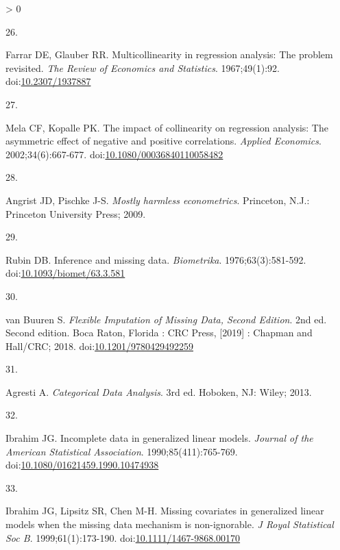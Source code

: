 \documentclass[
]{article}
\newlength{\cslhangindent}
\newlength{\csllabelwidth}
\newenvironment{CSLReferences}[2] %
 {%
  \setlength{\parindent}{0pt}
  \ifodd #1 \everypar{\setlength{\hangindent}{\cslhangindent}}\ignorespaces\fi
  \ifnum #2 > 0
  \setlength{\parskip}{#2\baselineskip}
  \fi
 }%
 {}
\newcommand{\CSLLeftMargin}[1]{\parbox[t]{\csllabelwidth}{#1}}
\newcommand{\CSLRightInline}[1]{\parbox[t]{\linewidth - \csllabelwidth}{#1}\break}
\begin{document}
\begin{CSLReferences}{0}{0}
\leavevmode\hypertarget{ref-farrarMulticollinearityRegressionAnalysis1967}{}%
\CSLLeftMargin{26. }
\CSLRightInline{Farrar DE, Glauber RR. Multicollinearity in regression analysis: The problem revisited. \emph{The Review of Economics and Statistics}. 1967;49(1):92. doi:\href{https://doi.org/10.2307/1937887}{10.2307/1937887}}

\leavevmode\hypertarget{ref-melaImpactCollinearityRegression2002}{}%
\CSLLeftMargin{27. }
\CSLRightInline{Mela CF, Kopalle PK. The impact of collinearity on regression analysis: The asymmetric effect of negative and positive correlations. \emph{Applied Economics}. 2002;34(6):667-677. doi:\href{https://doi.org/10.1080/00036840110058482}{10.1080/00036840110058482}}

\leavevmode\hypertarget{ref-angristpischke2009}{}%
\CSLLeftMargin{28. }
\CSLRightInline{Angrist JD, Pischke J-S. \emph{Mostly harmless econometrics}. Princeton, N.J.: Princeton University Press; 2009.}

\leavevmode\hypertarget{ref-rubinInferenceMissingData1976}{}%
\CSLLeftMargin{29. }
\CSLRightInline{Rubin DB. Inference and missing data. \emph{Biometrika}. 1976;63(3):581-592. doi:\href{https://doi.org/10.1093/biomet/63.3.581}{10.1093/biomet/63.3.581}}

\leavevmode\hypertarget{ref-vanbuurenFlexibleImputationMissing2018}{}%
\CSLLeftMargin{30. }
\CSLRightInline{van Buuren S. \emph{Flexible Imputation of Missing Data, Second Edition}. 2nd ed. Second edition. \textbar{} Boca Raton, Florida : CRC Press, {[}2019{]} \textbar: Chapman and Hall/CRC; 2018. doi:\href{https://doi.org/10.1201/9780429492259}{10.1201/9780429492259}}

\leavevmode\hypertarget{ref-agrestiCategoricalDataAnalysis2013}{}%
\CSLLeftMargin{31. }
\CSLRightInline{Agresti A. \emph{Categorical Data Analysis}. 3rd ed. Hoboken, NJ: Wiley; 2013.}

\leavevmode\hypertarget{ref-ibrahimIncompleteDataGeneralized1990}{}%
\CSLLeftMargin{32. }
\CSLRightInline{Ibrahim JG. Incomplete data in generalized linear models. \emph{Journal of the American Statistical Association}. 1990;85(411):765-769. doi:\href{https://doi.org/10.1080/01621459.1990.10474938}{10.1080/01621459.1990.10474938}}

\leavevmode\hypertarget{ref-ibrahimMissingCovariatesGeneralized1999}{}%
\CSLLeftMargin{33. }
\CSLRightInline{Ibrahim JG, Lipsitz SR, Chen M-H. Missing covariates in generalized linear models when the missing data mechanism is non-ignorable. \emph{J Royal Statistical Soc B}. 1999;61(1):173-190. doi:\href{https://doi.org/10.1111/1467-9868.00170}{10.1111/1467-9868.00170}}


\end{CSLReferences}
\end{document}
